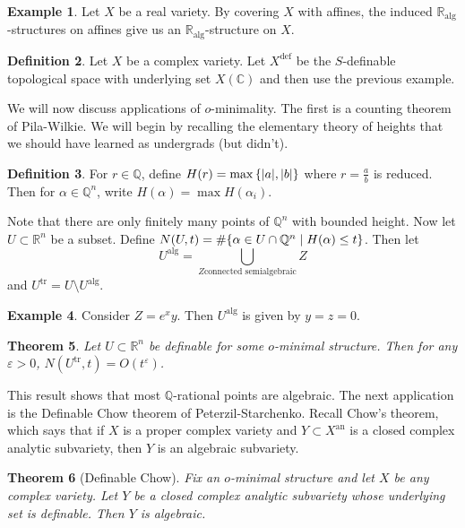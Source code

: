 \documentclass[leqno, openany]{memoir}
\newtheorem{thm}{Theorem}[section]
\theoremstyle{definition}
\newtheorem{defn}[thm]{Definition}
\newtheorem{exm}[thm]{Example}
\theoremstyle{remark}
\theoremstyle{plain}
\theoremstyle{definition}
\theoremstyle{remark}
\newcommand{\R}{\mathbb{R}}
\newcommand{\C}{\mathbb{C}}
\newcommand{\Q}{\mathbb{Q}}
\newcommand{\ep}{\varepsilon}
\newcommand{\mr}[1]{\mathrm{#1}}
\begin{document}
\begin{exm}
    Let $X$ be a real variety. By covering $X$ with affines, the induced $\R_{\mr{alg}}$-structures on affines give us an $\R_{\mr{alg}}$-structure on $X$.
\end{exm}

\begin{defn}
    Let $X$ be a complex variety. Let $X^{\mr{def}}$ be the $S$-definable topological space with underlying set $X(\C)$ and then use the previous example.
\end{defn}

We will now discuss applications of $o$-minimality. The first is a counting theorem of Pila-Wilkie. We will begin by recalling the elementary theory of heights that we should have learned as undergrads (but didn't).

\begin{defn}
    For $r \in \Q$, define $H(r) = \max\qty{\abs{a}, \abs{b}}$ where $r = \frac{a}{b}$ is reduced. Then for $\alpha \in \Q^n$, write $H(\alpha) = \max H(\alpha_i)$.
\end{defn}

Note that there are only finitely many points of $\Q^n$ with bounded height. Now let $U \subset \R^n$ be a subset. Define $N(U, t) = \# \qty{\alpha \in U \cap \Q^n \mid H(\alpha) \leq t}$. Then let 
\[ U^{\mr{alg}} = \bigcup_{Z \text{connected semialgebraic}} Z \]
and $U^{\mr{tr}} = U \setminus U^{\mr{alg}}$.

\begin{exm}
    Consider $Z = e^x y$. Then $U^{\mr{alg}}$ is given by $y = z = 0$.
\end{exm}

\begin{thm}
    Let $U \subset \R^n$ be definable for some $o$-minimal structure. Then for any $\ep > 0$, $N(U^{\mr{tr}}, t) = O(t^{\ep})$.
\end{thm}

This result shows that most $\Q$-rational points are algebraic. The next application is the Definable Chow theorem of Peterzil-Starchenko. Recall Chow's theorem, which says that if $X$ is a proper complex variety and $Y \subset X^{\mr{an}}$ is a closed complex analytic subvariety, then $Y$ is an algebraic subvariety.

\begin{thm}[Definable Chow]
    Fix an $o$-minimal structure and let $X$ be any complex variety. Let $Y$ be a closed complex analytic subvariety whose underlying set is definable. Then $Y$ is algebraic.
\end{thm}
\end{document}
